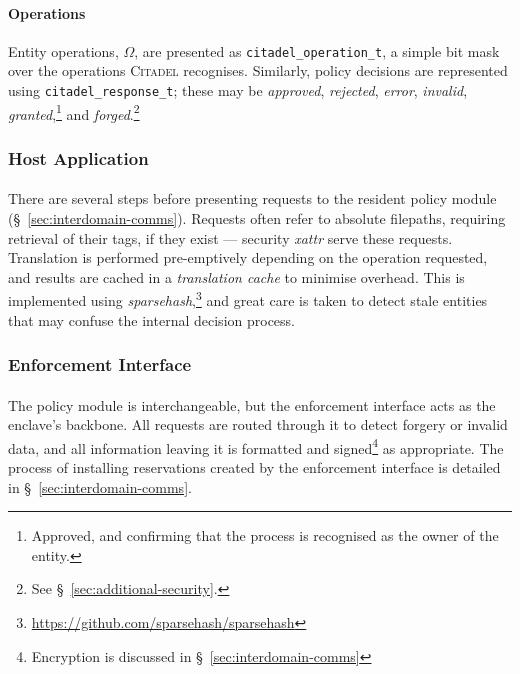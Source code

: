\paragraph{Operations} Entity operations, $\Omega$, are presented as \texttt{citadel\_operation\_t}, a simple bit mask over the operations \textsc{Citadel} recognises. Similarly, policy decisions are represented using \texttt{citadel\_response\_t}; these may be \textit{approved}, \textit{rejected}, \textit{error}, \textit{invalid}, \textit{granted},\footnote{Approved, and confirming that the process is recognised as the owner of the entity.} and \textit{forged}.\footnote{See §~\ref{sec:additional-security}.}


\subsubsection{Host Application}

\paragraph{} There are several steps before presenting requests to the resident policy module (§~\ref{sec:interdomain-comms}). Requests often refer to absolute filepaths, requiring retrieval of their tags, if they exist --- security \textit{\acrshort{xattr}} serve these requests. Translation is performed pre-emptively depending on the operation requested, and results are cached in a \textit{translation cache} to minimise overhead. This is implemented using \textit{sparsehash},\footnote{\url{https://github.com/sparsehash/sparsehash}} and great care is taken to detect stale entities that may confuse the internal decision process.


\subsubsection{Enforcement Interface}
\paragraph{} The policy module is interchangeable, but the enforcement interface acts as the enclave's backbone. All requests are routed through it to detect forgery or invalid data, and all information leaving it is formatted and signed\footnote{Encryption is discussed in §~\ref{sec:interdomain-comms}} as appropriate. The process of installing reservations created by the enforcement interface is detailed in §~\ref{sec:interdomain-comms}.

